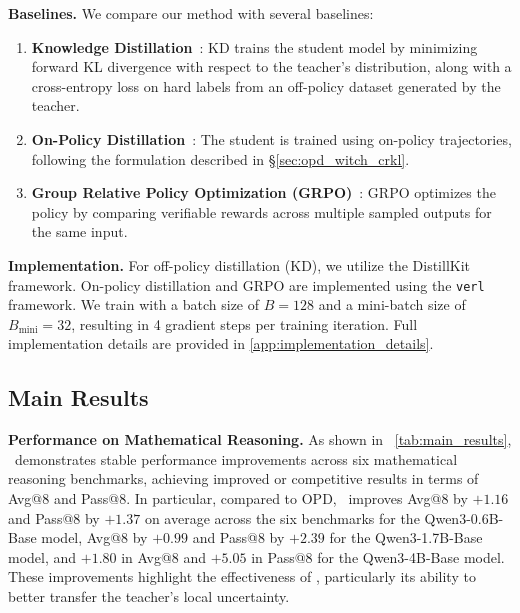 \textbf{Baselines.}
We compare our method with several baselines: 
\begin{enumerate}[leftmargin=1em, itemsep=0.2mm, topsep=1pt]
\item  \textbf{Knowledge Distillation}~\cite{hinton2015distilling, kim2016sequence}: KD trains the student model by minimizing forward KL divergence with respect to the teacher's distribution, along with a cross-entropy loss on hard labels from an off-policy dataset generated by the teacher.
\item \textbf{On-Policy Distillation}~\cite{lu2025onpolicydistillation}: The student is trained using on-policy trajectories, following the formulation described in \S\ref{sec:opd_witch_crkl}.
\item \textbf{Group Relative Policy Optimization (GRPO)}~\cite{shao2024deepseekmath}: GRPO optimizes the policy by comparing verifiable rewards across multiple sampled outputs for the same input. 
\end{enumerate}
\textbf{Implementation.}
For off-policy distillation (KD), we utilize the DistillKit~\cite{distillkit2024} framework. On-policy distillation and GRPO are implemented using the \texttt{verl}~\cite{sheng2024hybridflow} framework. We train with a batch size of $B=128$ and a mini-batch size of $B_{\text{mini}}=32$, resulting in 4
gradient steps per training iteration. Full implementation details are provided in \autoref{app:implementation_details}.

\subsection{Main Results}

\textbf{Performance on Mathematical Reasoning.}\label{sec:math_main}
As shown in ~\autoref{tab:main_results}, \method~demonstrates stable performance improvements across six mathematical reasoning benchmarks, achieving improved or competitive results in terms of Avg@8 and Pass@8. In particular, compared to OPD, \method~improves Avg@8 by $+1.16$ and Pass@8 by $+1.37$ on average across the six benchmarks for the Qwen3-0.6B-Base model, Avg@8 by $+0.99$ and Pass@8 by $+2.39$ for the Qwen3-1.7B-Base model, and $+1.80$ in Avg@8 and $+5.05$ in Pass@8 for the Qwen3-4B-Base model. These improvements highlight the effectiveness of \method, particularly its ability to better transfer the teacher's local uncertainty.



